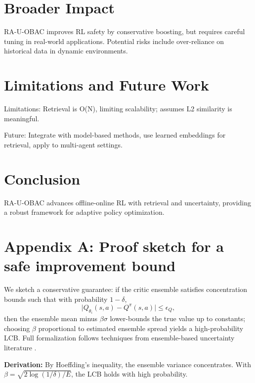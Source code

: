 \documentclass{article}
\begin{document}
\section{Broader Impact}
\label{sec:impact}

RA-U-OBAC improves RL safety by conservative boosting, but requires careful tuning in real-world applications. Potential risks include over-reliance on historical data in dynamic environments.

\section{Limitations and Future Work}

Limitations: Retrieval is O(N), limiting scalability; assumes L2 similarity is meaningful.

Future: Integrate with model-based methods, use learned embeddings for retrieval, apply to multi-agent settings.

\section{Conclusion}
\label{sec:conclusion}

RA-U-OBAC advances offline-online RL with retrieval and uncertainty, providing a robust framework for adaptive policy optimization.




\section{Appendix A: Proof sketch for a safe improvement bound}

We sketch a conservative guarantee: if the critic ensemble satisfies concentration bounds such that with probability $1-\delta$,
\begin{equation}
  \big|Q_{\theta_i}(s,a) - Q^\pi(s,a)\big| \le \epsilon_Q,
\end{equation}
then the ensemble mean minus $\beta\sigma$ lower-bounds the true value up to constants; choosing $\beta$ proportional to estimated ensemble spread yields a high-probability LCB. Full formalization follows techniques from ensemble-based uncertainty literature \cite{lakshminarayanan2017}.

\textbf{Derivation:} By Hoeffding's inequality, the ensemble variance concentrates. With $\beta = \sqrt{2 \log(1/\delta) / E}$, the LCB holds with high probability.
\end{document}
